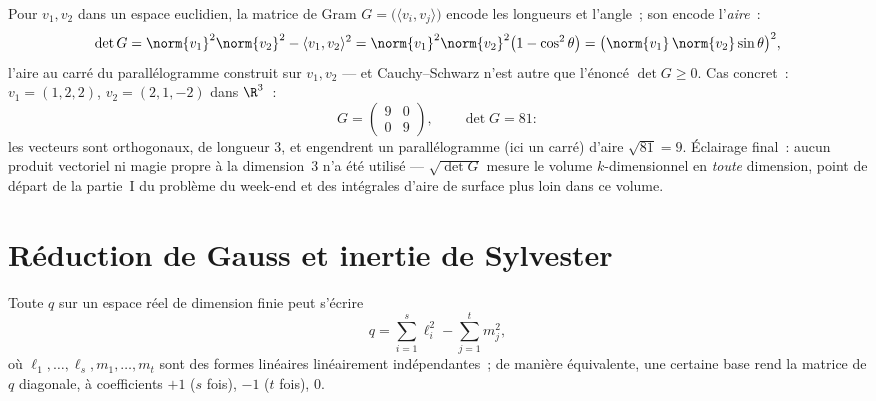 \begin{example}\label{ex:b2:quadratic:gramarea}
Pour $v_1, v_2$ dans un espace euclidien, la matrice de Gram $G =
\bigl(\langle v_i, v_j\rangle\bigr)$ encode les longueurs et
l'angle~; son  encode l'\emph{aire}~:
\[
\det G = \norm{v_1}^2\norm{v_2}^2 - \langle v_1, v_2\rangle^2
= \norm{v_1}^2\norm{v_2}^2\bigl(1 - \cos^2\theta\bigr)
= \bigl(\norm{v_1}\,\norm{v_2}\sin\theta\bigr)^2 ,
\]
l'aire au carré du parallélogramme construit sur $v_1, v_2$ ---
et Cauchy--Schwarz n'est autre que l'énoncé $\det G \geq 0$.
Cas concret~: $v_1 = (1, 2, 2)$, $v_2 = (2, 1, -2)$ dans
$\R^3$~:
\[
G = \begin{pmatrix} 9 & 0\\ 0 & 9 \end{pmatrix},
\qquad
\det G = 81 :
\]
les vecteurs sont orthogonaux, de longueur $3$, et engendrent un
parallélogramme (ici un carré) d'aire $\sqrt{81} = 9$.
Éclairage final~: aucun produit vectoriel ni magie propre à la
dimension~$3$ n'a été utilisé --- $\sqrt{\det G}$ mesure le volume
$k$-dimensionnel en \emph{toute} dimension, point de départ de la
partie~I du problème du week-end et des intégrales d'aire de
surface plus loin dans ce volume.
\end{example}

\section{Réduction de Gauss et inertie de Sylvester}

\begin{theorem}\label{thm:b2:quadratic:gauss}
Toute  $q$ sur un espace réel de dimension finie
peut s'écrire
\[
q = \sum_{i=1}^{s} \ell_i^2 - \sum_{j=1}^{t} m_j^2 ,
\]
où $\ell_1, \dots, \ell_s, m_1, \dots, m_t$ sont des formes
linéaires linéairement indépendantes~; de manière équivalente, une
certaine base rend la matrice de $q$ diagonale, à coefficients $+1$
($s$ fois), $-1$ ($t$ fois), $0$.
\end{theorem}

